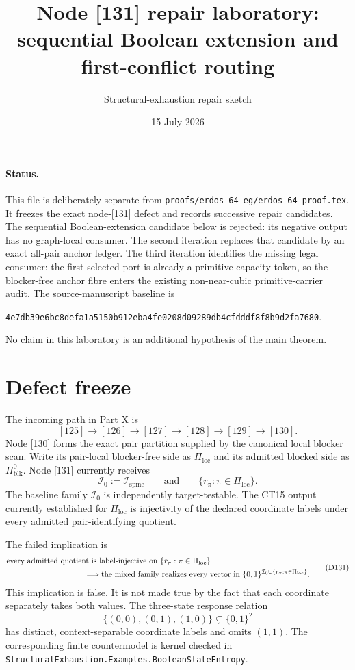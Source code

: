 \documentclass[11pt]{article}
\title{Node [131] repair laboratory:\\
sequential Boolean extension and first-conflict routing}
\author{Structural-exhaustion repair sketch}
\date{15 July 2026}
\newcommand{\Coords}{\mathcal I}
\newcommand{\Pair}{\Pi}
\begin{document}
\maketitle

\paragraph{Status.}
This file is deliberately separate from
\texttt{proofs/erdos\_64\_eg/erdos\_64\_proof.tex}.  It freezes the exact
node-[131] defect and records successive repair candidates.  The sequential
Boolean-extension candidate below is rejected: its negative output has no
graph-local consumer.  The second iteration replaces that candidate by an
exact all-pair anchor ledger.  The third iteration identifies the missing
legal consumer: the first selected port is already a primitive capacity
token, so the blocker-free anchor fibre enters the existing non-near-cubic
primitive-carrier audit.  The source-manuscript baseline is
\begin{center}
\texttt{4e7db39e6bc8defa1a5150b912eba4fe0208d09289db4cfdddf8f8b9d2fa7680}.
\end{center}
No claim in this laboratory is an additional hypothesis of the main theorem.

\section{Defect freeze}

The incoming path in Part X is
\[
[125]\longrightarrow[126]\longrightarrow[127]\longrightarrow[128]
\longrightarrow[129]\longrightarrow[130].
\]
Node [130] forms the exact pair partition supplied by the canonical local
blocker scan.  Write its pair-local blocker-free side as
$\Pair_{\mathrm{loc}}$ and its admitted blocked side as
$\Pair_{\mathrm{blk}}^0$.  Node [131] currently receives
\[
\Coords_0:=\Coords_{\mathrm{spine}}
\qquad\text{and}\qquad
\{r_\pi:\pi\in\Pair_{\mathrm{loc}}\}.
\]
The baseline family $\Coords_0$ is independently target-testable.  The CT15
output currently established for $\Pair_{\mathrm{loc}}$ is injectivity of the
declared coordinate labels under every admitted pair-identifying quotient.

The failed implication is
\[
\begin{split}
&\text{every admitted quotient is label-injective on }
  \{r_\pi:\pi\in\Pair_{\mathrm{loc}}\}\\
&\hspace{35mm}\Longrightarrow
\text{the mixed family realizes every vector in }
\{0,1\}^{\Coords_0\cup\{r_\pi:\pi\in\Pair_{\mathrm{loc}}\}}.
\end{split} \tag{D131}
\]
This implication is false.  It is not made true by the fact that each
coordinate separately takes both values.  The three-state response relation
\[
\{(0,0),(0,1),(1,0)\}\subsetneq\{0,1\}^2
\]
has distinct, context-separable coordinate labels and omits $(1,1)$.  The
corresponding finite countermodel is kernel checked in
\texttt{StructuralExhaustion.Examples.BooleanStateEntropy}.
\end{document}

